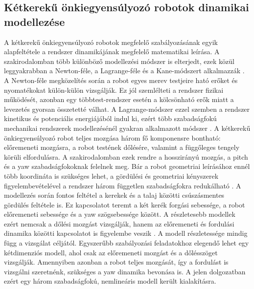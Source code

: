 \documentclass[12pt,a4paper]{report}
\begin{document}
	\subsection{Kétkerekű önkiegyensúlyozó robotok dinamikai modellezése}
	A kétkerekű önkiegyensúlyozó robotok megfelelő szabályozásának egyik alapfeltétele a rendszer dinamikájának megfelelő matematikai leírása. A szakirodalomban több különböző modellezési módszer is elterjedt, ezek közül leggyakrabban a Newton-féle, a Lagrange-féle és a Kane-módszert alkalmazzák \cite{chan2013,kimkwon2015}.
	\newline
	\newline
	A Newton-féle megközelítés során a robot egyes merev testjeire ható erőket és nyomatékokat külön-külön vizsgálják. Ez jól szemlélteti a rendszer fizikai működését, azonban egy többtest-rendszer esetén a kölcsönható erők miatt a levezetés gyorsan összetetté válhat. A Lagrange-módszer ezzel szemben a rendszer kinetikus és potenciális energiájából indul ki, ezért több szabadságfokú mechanikai rendszerek modellezésénél gyakran alkalmazott módszer \cite{kimkwon2015}.
	\newline
	\newline
	A kétkerekű önkiegyensúlyozó robot teljes mozgása három fő komponensre bontható: előremeneti mozgásra, a robot testének dőlésére, valamint a függőleges tengely körüli elfordulásra. A szakirodalomban ezek rendre a hosszirányú mozgás, a pitch és a yaw szabadságfokoknak felelnek meg. Bár a robot geometriai leírásához ennél több koordináta is szükséges lehet, a gördülési és geometriai kényszerek figyelembevételével a rendszer három független szabadságfokra redukálható \cite{kimkwon2015}.
	\newline
	\newline
	A modellezés során fontos feltétel a kerekek és a talaj közötti csúszásmentes gördülés feltétele is. Ez kapcsolatot teremt a két kerék forgási sebessége, a robot előremeneti sebessége és a yaw szögsebessége között. A részletesebb modellek ezért nemcsak a dőlési mozgást vizsgálják, hanem az előremeneti és fordulási dinamika közötti kapcsolatot is figyelembe veszik \cite{kimkwon2015}.
	\newline
	\newline
	A modell részletessége mindig függ a vizsgálat céljától. Egyszerűbb szabályozási feladatokhoz elegendő lehet egy kétdimenziós modell, ahol csak az előremeneti mozgást és a dőlésszöget vizsgálják. Amennyiben azonban a robot teljes mozgását, így a fordulást is vizsgálni szeretnénk, szükséges a yaw dinamika bevonása is. A jelen dolgozatban ezért egy három szabadságfokú, nemlineáris modell került kialakításra.
	
\end{document}
